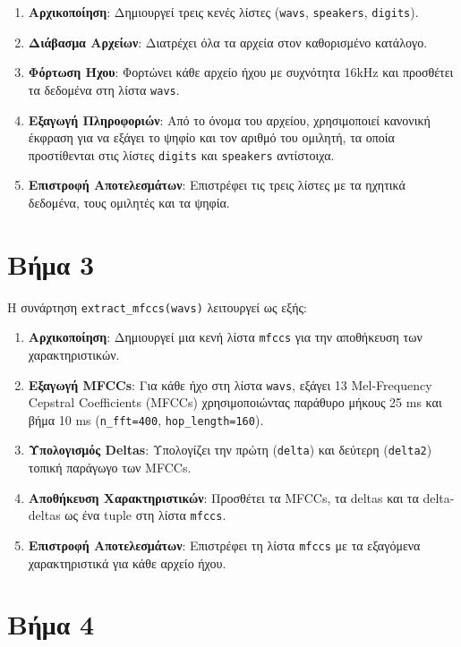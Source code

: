 \documentclass[a4paper,12pt]{article}
\begin{document}
\begin{enumerate}
    \item \textbf{Αρχικοποίηση}: Δημιουργεί τρεις κενές λίστες (\texttt{wavs}, \texttt{speakers}, \texttt{digits}).
    \item \textbf{Διάβασμα Αρχείων}: Διατρέχει όλα τα αρχεία στον καθορισμένο κατάλογο.
    \item \textbf{Φόρτωση Ήχου}: Φορτώνει κάθε αρχείο ήχου με συχνότητα 16kHz και προσθέτει τα δεδομένα στη λίστα \texttt{wavs}.
    \item \textbf{Εξαγωγή Πληροφοριών}: Από το όνομα του αρχείου, χρησιμοποιεί κανονική έκφραση για να εξάγει το ψηφίο και τον αριθμό του ομιλητή, τα οποία προστίθενται στις λίστες \texttt{digits} και \texttt{speakers} αντίστοιχα.
    \item \textbf{Επιστροφή Αποτελεσμάτων}: Επιστρέφει τις τρεις λίστες με τα ηχητικά δεδομένα, τους ομιλητές και τα ψηφία.
\end{enumerate}

\section*{Βήμα 3}

Η συνάρτηση \texttt{extract\_mfccs(wavs)} λειτουργεί ως εξής:

\begin{enumerate}
    \item \textbf{Αρχικοποίηση}: Δημιουργεί μια κενή λίστα \texttt{mfccs} για την αποθήκευση των χαρακτηριστικών.
    \item \textbf{Εξαγωγή MFCCs}: Για κάθε ήχο στη λίστα \texttt{wavs}, εξάγει 13 Mel-Frequency Cepstral Coefficients (MFCCs) χρησιμοποιώντας παράθυρο μήκους 25 ms και βήμα 10 ms (\texttt{n\_fft=400}, \texttt{hop\_length=160}).
    \item \textbf{Υπολογισμός Deltas}: Υπολογίζει την πρώτη (\texttt{delta}) και δεύτερη (\texttt{delta2}) τοπική παράγωγο των MFCCs.
    \item \textbf{Αποθήκευση Χαρακτηριστικών}: Προσθέτει τα MFCCs, τα deltas και τα delta-deltas ως ένα tuple στη λίστα \texttt{mfccs}.
    \item \textbf{Επιστροφή Αποτελεσμάτων}: Επιστρέφει τη λίστα \texttt{mfccs} με τα εξαγόμενα χαρακτηριστικά για κάθε αρχείο ήχου.
\end{enumerate}

\section*{Βήμα 4}
\end{document}
